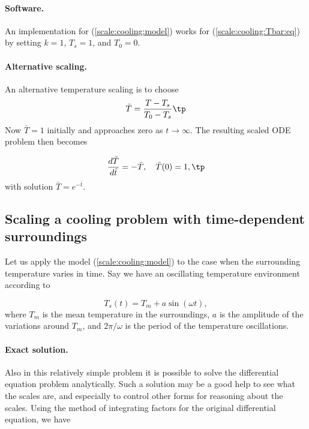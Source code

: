 \documentclass[graybox,envcountchap,sectrefs,final]{svmonodo}
\begin{document}
\paragraph{Software.}
An implementation for (\ref{scale:cooling:model}) works for
(\ref{scale:cooling:Tbar:eq}) by setting $k=1$, $T_s=1$, and $T_0=0$.

\paragraph{Alternative scaling.}
An alternative temperature scaling is to choose
\begin{equation}
\bar T = \frac{T-T_s}{T_0-T_s}
\label{scale:cooling:Tbar2}
\tp
\end{equation}
Now $\bar T=1$ initially and approaches zero as $t\rightarrow\infty$.
The resulting scaled ODE problem then becomes

\begin{equation}
\frac{d\bar T}{d\bar t} = - \bar T,\quad \bar T(0)=1,
\label{scale:cooling:Tbar:eq2}
\tp
\end{equation}
with solution $\bar T = e^{-\bar t}$.

\subsection{Scaling a cooling problem with time-dependent surroundings}
\label{scale:cooling:osc}

Let us apply the model (\ref{scale:cooling:model}) to the case when
the surrounding temperature varies in time. Say we have
an oscillating temperature environment according to

\begin{equation}
T_s(t) = T_m + a\sin(\omega t),
\label{scale:cooling:Tst}
\end{equation}
where $T_m$ is the mean temperature in the surroundings, $a$ is
the amplitude of the variations around $T_m$, and $2\pi/\omega$ is
the period of the temperature oscillations.

\paragraph{Exact solution.}
Also in this relatively simple problem
it is possible to solve the differential equation problem analytically.
Such a solution may be a good help to see what the scales are, and
especially to control other forms for reasoning about the scales.
Using the method of integrating factors for the
original differential equation, we have
\end{document}
